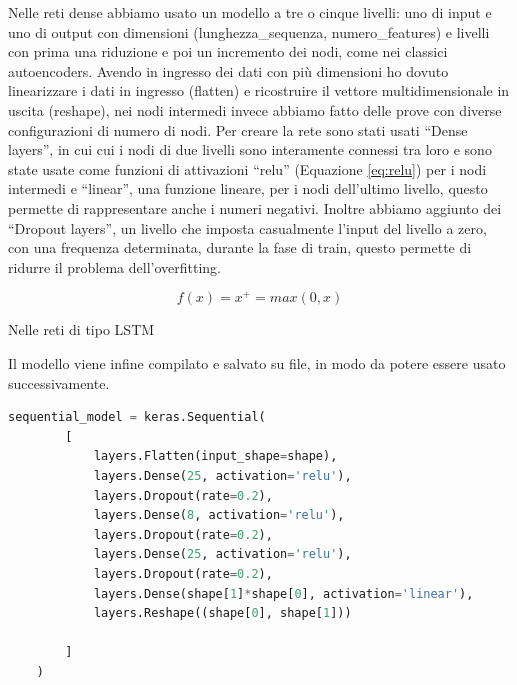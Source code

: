 Nelle reti dense abbiamo usato un modello a tre o cinque livelli: uno di input e uno di output con dimensioni (lunghezza\_sequenza, numero\_features) e livelli con prima una riduzione e poi un incremento dei nodi, come nei classici autoencoders.
Avendo in ingresso dei dati con più dimensioni ho dovuto linearizzare i dati in ingresso (flatten) e ricostruire il vettore multidimensionale in uscita (reshape), nei nodi intermedi invece abbiamo fatto delle prove con diverse configurazioni di numero di nodi.
Per creare la rete sono stati usati ``Dense layers'', in cui cui i nodi di due livelli sono interamente connessi tra loro e sono state usate come funzioni di attivazioni ``relu'' (Equazione \ref{eq:relu}) per i nodi intermedi e ``linear'', una funzione lineare, per i nodi dell'ultimo livello, questo permette di rappresentare anche i numeri negativi.
Inoltre abbiamo aggiunto dei ``Dropout layers'', un livello che imposta casualmente l'input del livello a zero, con una frequenza determinata, durante la fase di train, questo permette di ridurre il problema dell'overfitting.

\begin{equation} \label{eq:relu}
    f(x) = x^+ = max(0, x)
\end{equation}

Nelle reti di tipo LSTM 

Il modello viene infine compilato e salvato su file, in modo da potere essere usato successivamente.

\begin{lstlisting}[language=Python, label={code:get_data}, caption={Funzione usata per generale il modello della rete neurale}]
    sequential_model = keras.Sequential(
        [
            layers.Flatten(input_shape=shape),
            layers.Dense(25, activation='relu'),
            layers.Dropout(rate=0.2),
            layers.Dense(8, activation='relu'),
            layers.Dropout(rate=0.2),
            layers.Dense(25, activation='relu'),
            layers.Dropout(rate=0.2),
            layers.Dense(shape[1]*shape[0], activation='linear'),
            layers.Reshape((shape[0], shape[1]))

        ]
    )
\end{lstlisting}

